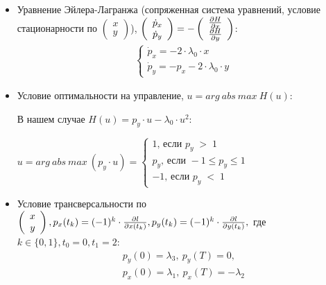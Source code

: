 \documentclass[a4paper,12pt]{article}
\newcommand{\partdef}[2]{\frac{\partial \mathnormal{#1}}{\partial \mathnormal{#2}}}
\begin{document}
\begin{itemize}
    \item[\text{(a)}]

    Уравнение Эйлера-Лагранжа (сопряженная система уравнений, условие стационарности по 
    $
    \left( 
        \begin{array}{c}
            x \\
            y
        \end{array}
    \right)
    $),
    $
    \left( 
        \begin{array}{c}
            \dot p_x \\
            \dot p_y
        \end{array}
    \right)=-
    \left( 
        \begin{array}{c}
            \partdef{H}{x} \\
            \partdef{H}{y}
        \end{array}
    \right)
    $:
    \begin{align}
    \left\{
    \begin{array}{l}
        \dot p_x = -2 \cdot \lambda_0 \cdot x\\
        \dot p_y = -p_x - 2 \cdot \lambda_0 \cdot y
    \end{array}
    \right.
    \end{align}

\item[\text{(б)}]
Условие оптимальности на управление, $u=arg \:abs\: max\: H(u)$:

В нашем случае $H(u)=p_y \cdot u - \lambda_0 \cdot u^2$:

$u=arg \:abs\: max\:(p_y \cdot u )=\left\{
    \begin{array}{l}
        1 \text{, если } p_y\;>\;1\\
        p_y \text{, если } -1 \leq p_y\leq 1\\
        -1 \text{, если } p_y\;<\;1
    \end{array}
\right.
$

\item[\text{(в)}]
Условие трансверсальности по 
$
\left(
\begin{array}{c}
    x \\
    y
\end{array}
\right)
,
p_x(t_k)=(-1)^k \cdot \partdef{l}{x(t_k)},
p_y(t_k)=(-1)^k \cdot \partdef{l}{y(t_k)},
$ где $k\in\{0,1\},t_0=0,t_1=2:$
\begin{align}
    p_y(0)=\lambda_3,\: p_y(T)=0,\\
    p_x(0)=\lambda_1,\: p_x(T)=-\lambda_2
\end{align}


\end{itemize}
\end{document}
